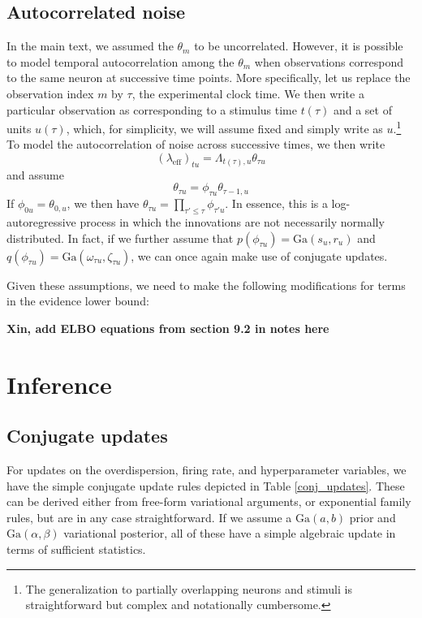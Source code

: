 \documentclass[10pt,letterpaper]{article}
\begin{document}
\subsection{Autocorrelated noise}
In the main text, we assumed the $\theta_m$ to be uncorrelated. However, it is possible to model temporal autocorrelation among the $\theta_m$ when observations correspond to the same neuron at successive time points. More specifically, let us replace the observation index $m$ by $\tau$, the experimental clock time. We then write a particular observation as corresponding to a stimulus time $t(\tau)$ and a set of units $u(\tau)$, which, for simplicity, we will assume fixed and simply write as $u$.\footnote{The generalization to partially overlapping neurons and stimuli is straightforward but complex and notationally cumbersome.} To model the autocorrelation of noise across successive times, we then write
\begin{equation}
    (\lambda_{\mathrm{eff}})_{tu} = \Lambda_{t(\tau), u} \theta_{\tau u}
\end{equation}
and assume
\begin{equation}
    \theta_{\tau u} = \phi_{\tau u} \theta_{\tau - 1, u}
\end{equation}
If $\phi_{0u} = \theta_{0, u}$, we then have $\theta_{\tau u} = \prod_{\tau' \le \tau} \phi_{\tau' u}$. In essence, this is a log-autoregressive process in which the innovations are not necessarily normally distributed. In fact, if we further assume that $p(\phi_{\tau u}) = \mathrm{Ga}(s_u, r_u)$ and $q(\phi_{\tau u}) = \mathrm{Ga}(\omega_{\tau u}, \zeta_{\tau u})$, we can once again make use of conjugate updates.

Given these assumptions, we need to make the following modifications for terms in the evidence lower bound:

{\bf Xin, add ELBO equations from section 9.2 in notes here}


\section{Inference}
\subsection{Conjugate updates}
For updates on the overdispersion, firing rate, and hyperparameter variables, we have the simple conjugate update rules depicted in Table \ref{conj_updates}. These can be derived either from free-form variational arguments, or exponential family rules, but are in any case straightforward\cite{Blei2006-oh}. If we assume a $\text{Ga}(a, b)$ prior and $\text{Ga}(\alpha, \beta)$ variational posterior, all of these have a simple algebraic update in terms of sufficient statistics.
\end{document}
